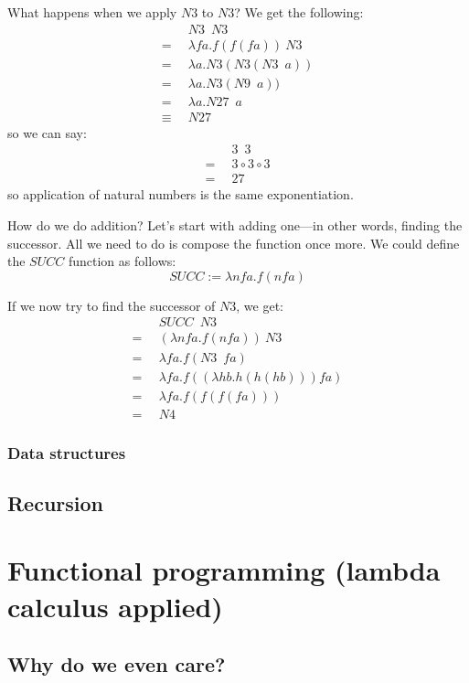 \documentclass[11pt]{article}
\begin{document}
What happens when we apply \(N3\) to \(N3\)? We get the following:
\begin{align*}
	&N3\enspace N3\\
	=\enspace&\lambda fa.f(f(fa))\:N3\\
	=\enspace&\lambda a.N3(N3(N3\enspace a))\\
	=\enspace&\lambda a.N3(N9\enspace a))\\
	=\enspace&\lambda a.N27\enspace a\\
	\equiv\enspace&N27
\end{align*}
so we can say:
\begin{align*}
	&3\enspace3\\
	=\enspace&3\circ3\circ3\\
	=\enspace&27
\end{align*}
so application of natural numbers is the same exponentiation.

How do we do addition? Let's start with adding one---in other words, finding
the successor. All we need to do is compose the function once more. We could
define the \(SUCC\) function as follows:
\[SUCC:=\lambda nfa.f(nfa)\]

If we now try to find the successor of \(N3\), we get:
\begin{align*}
	&SUCC\enspace N3\\
	=\enspace&(\lambda nfa.f(nfa))\:N3\\
	=\enspace&\lambda fa.f(N3\enspace fa)\\
	=\enspace&\lambda fa.f((\lambda hb.h(h(hb)))fa)\\
	=\enspace&\lambda fa.f(f(f(fa)))\\
	=\enspace&N4
\end{align*}

\subsubsection{Data structures}

\subsection{Recursion}

\section{Functional programming (lambda calculus applied)}

\subsection{Why do we even care?}
\end{document}
